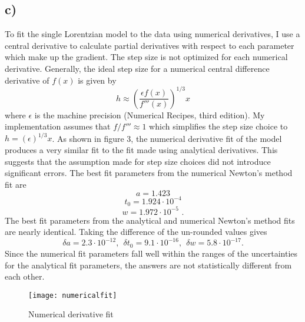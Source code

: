 \documentclass{article}
\newcommand{\<}[1]{\left\langle #1 \right\rangle }
\begin{document}
\subsection{c)}
To fit the single Lorentzian model to the data using numerical derivatives, I use a central derivative to calculate partial derivatives with respect to each parameter which make up the gradient. The step size is not optimized for each numerical derivative. Generally, the ideal step size for a numerical central difference derivative of $f(x)$ is given by
\[h \approx \left(\frac{\epsilon f(x)}{f'''(x)}\right)^{1/3} x\]
where $\epsilon$ is the machine precision (Numerical Recipes, third edition). My implementation assumes that $f/f''' \approx 1$ which simplifies the step size choice to $h = (\epsilon)^{1/3}x$. As shown in figure 3, the numerical derivative fit of the model produces a very similar fit to the fit made using analytical derivatives. This suggests that the assumption made for step size choices did not introduce significant errors. The best fit parameters from the numerical Newton's method fit are
\[a = 1.423\]
\[t_0 = 1.924 \cdot 10^{-4}\]
\[w = 1.972 \cdot 10^{-5} \text{ .}\]
The best fit parameters from the analytical and numerical Newton's method fits are nearly identical. Taking the difference of the un-rounded values gives
\[\delta a = 2.3 \cdot 10^{-12}, \ \ \delta t_0 = 9.1\cdot 10^{-16}, \ \ \delta w = 5.8 \cdot 10^{-17} .\]
Since the numerical fit parameters fall well within the ranges of the uncertainties for the analytical fit parameters, the answers are not statistically different from each other.
\begin{figure}[h]
	\caption{Numerical derivative fit}
	\centering
	\texttt{[image: numericalfit]}
\end{figure}
\end{document}
